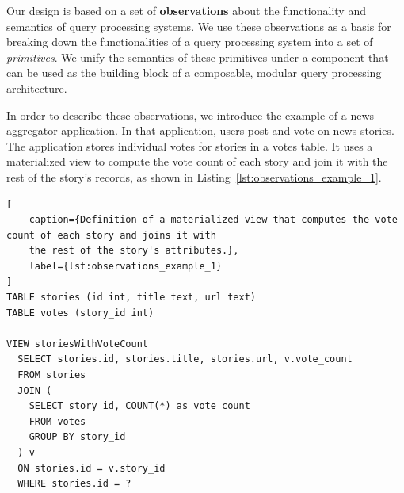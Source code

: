 




\bigskip
\noindent
Our design is based on a set of \textbf{observations} about the functionality and semantics of query processing systems.
We use these observations as a basis for breaking down the functionalities of a query processing system into a
set of \textit{primitives}.
We unify the semantics of these primitives under a component that can be used as the building block
of a composable, modular query processing architecture.

In order to describe these observations, we introduce the example of a news aggregator application.
In that application, users post and vote on news stories.
The application stores individual votes for stories in a votes table.
It uses a materialized view to compute the vote count of each story and join it with the rest of the story's records,
as shown in Listing~\ref{lst:observations_example_1}.

\begin{lstlisting}[
    caption={Definition of a materialized view that computes the vote count of each story and joins it with
    the rest of the story's attributes.},
    label={lst:observations_example_1}
]
TABLE stories (id int, title text, url text)
TABLE votes (story_id int)

VIEW storiesWithVoteCount
  SELECT stories.id, stories.title, stories.url, v.vote_count
  FROM stories
  JOIN (
    SELECT story_id, COUNT(*) as vote_count
    FROM votes
    GROUP BY story_id
  ) v
  ON stories.id = v.story_id
  WHERE stories.id = ?
\end{lstlisting}

